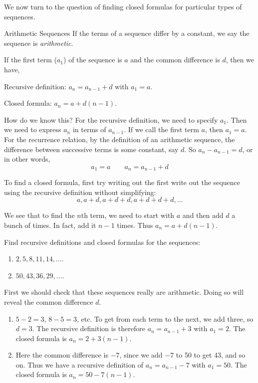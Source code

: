 \documentclass[12pt]{article}
\begin{document}
We now turn to the question of finding closed formulas for particular types of sequences.

\begin{defbox}{Arithmetic Sequences}
  If the terms of a sequence differ by a constant, we say the sequence is {\em arithmetic}.
  
  If the first term ($a_1$) of the sequence is $a$ and the common difference is $d$, then we have,
  
  Recursive definition: $a_n = a_{n-1} + d$ with $a_1 = a$.
  
  Closed formula: $a_n = a + d(n-1)$.
\end{defbox}

How do we know this? For the recursive definition, we need to specify $a_1$.  Then we need to express $a_n$ in terms of $a_{n-1}$.  If we call the first term $a$, then $a_1 = a$.  For the recurrence relation, by the definition of an arithmetic sequence, the difference between successive terms is some constant, say $d$.  So $a_n - a_{n-1} = d$, or in other words, \[ a_1 = a \qquad a_n=a_{n-1}+d\]

To find a closed formula, first try writing out the first write out the sequence using the recursive definition without simplifying:
\[a, a+d, a+d+d, a+d+d+d, \ldots\]

We see that to find the $n$th term, we need to start with $a$ and then add $d$ a bunch of times. In fact, add it $n-1$ times.  Thus $a_n = a+d(n-1)$.  

\begin{example}
  Find recursive definitions and closed formulas for the sequences:
  \begin{enumerate}
  \item $2, 5, 8, 11, 14, \ldots$.
    \item $50, 43, 36, 29, \ldots$.
    
  \end{enumerate}
  \begin{solution}
  First we should check that these sequences really are arithmetic.  Doing so will reveal the common difference $d$.
    \begin{enumerate}
      \item $5-2 = 3$, $8-5 = 3$, etc.  To get from each term to the next, we add three, so $d = 3$.  The recursive definition is therefore $a_n = a_{n-1} + 3$ with $a_1 = 2$.  The closed formula is $a_n = 2 + 3(n-1)$.
      \item Here the common difference is $-7$, since we add $-7$ to 50 to get 43, and so on.  Thus we have a recursive definition of $a_n = a_{n-1} - 7$ with $a_1 = 50$.  The closed formula is $a_n = 50 - 7(n-1)$.
    \end{enumerate}

  \end{solution}

\end{example}
\end{document}
